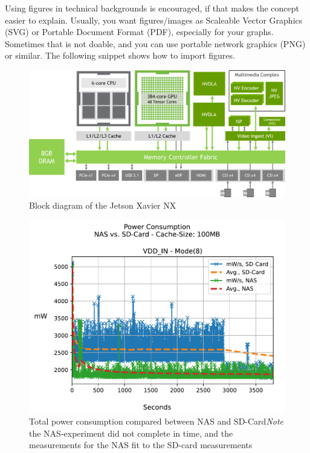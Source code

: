\documentclass[conference]{IEEEtran}
\begin{document}
Using figures in technical backgrounds is encouraged, if that makes the concept easier to explain. Usually, you want figures/images as Scaleable Vector Graphics (SVG) or Portable Document Format (PDF), especially for your graphs. Sometimes that is not doable, and you can use portable network graphics (PNG) or similar.
The following snippet shows how to import figures.

\begin{figure}[htbp]
	\centering
	\includegraphics[scale=0.75]{figures/jetson_nx.png}
	\caption{Block diagram of the Jetson Xavier NX}
	\label{fig:block_diagram}
\end{figure}

\begin{figure}[htbp]
	\begin{center}
		\includegraphics[width=\linewidth]{figures/NVSD_VDD_IN.pdf}
		\caption{Total power consumption compared between NAS and SD-Card\newline \emph{Note} the NAS-experiment did not complete in time, and the measurements for the NAS fit to the SD-card measurements}
		\label{fig:local_nas_sd_compare_pdf}
	\end{center}
\end{figure}
\end{document}
